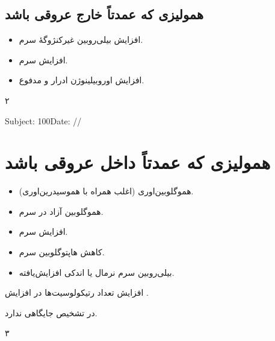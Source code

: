 \documentclass[11pt,a4paper]{article}
\begin{document}
\subsection*{همولیزی که عمدتاً خارج عروقی باشد}
\begin{itemize}
\item افزایش بیلی‌روبین غیرکنژوگهٔ سرم.
\item افزایش  سرم.
\item افزایش اوروبیلینوژن ادرار و مدفوع.
\end{itemize}
\vfill
\begin{center}\qquad ۲\end{center}

\clearpage
\begin{latin}
Subject: 100\hfill Date: /\quad/
\end{latin}
\section*{همولیزی که عمدتاً داخل عروقی باشد}
\begin{itemize}
\item هموگلوبین‌اوری (اغلب همراه با هموسیدرین‌اوری).
\item هموگلوبین آزاد در سرم.
\item افزایش  سرم.
\item کاهش هاپتوگلوبین سرم.
\item بیلی‌روبین سرم نرمال یا اندکی افزایش‌یافته.
\end{itemize}

افزایش تعداد رتیکولوسیت‌ها در  \HemolyticArrow{}
افزایش .

 در تشخیص  جایگاهی ندارد.
\vfill
\begin{center}\qquad ۳\end{center}
\endgroup
\ifHemolyticStandalone
  \expandafter\enddocument
\fi
\end{document}
